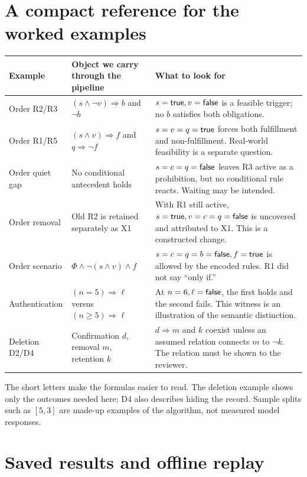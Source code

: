 \section{A compact reference for the worked examples}\label{app:examples}

\begin{longtable}{@{}p{.17\linewidth}p{.36\linewidth}p{.41\linewidth}@{}}
\toprule
Example & Object we carry through the pipeline & What to look for \\
\midrule
\endhead
Order R2/R3 & $(s\land\neg v)\Rightarrow b$ and $\neg b$ & $s=\mathsf{true},v=\mathsf{false}$ is a feasible trigger; no $b$ satisfies both obligations. \\
Order R1/R5 & $(s\land v)\Rightarrow f$ and $q\Rightarrow\neg f$ & $s=v=q=\mathsf{true}$ forces both fulfillment and non-fulfillment. Real-world feasibility is a separate question. \\
Order quiet gap & No conditional antecedent holds & $s=c=q=\mathsf{false}$ leaves R3 active as a prohibition, but no conditional rule reacts. Waiting may be intended. \\
Order removal & Old R2 is retained separately as X1 & With R1 still active, $s=\mathsf{true},v=c=q=\mathsf{false}$ is uncovered and attributed to X1. This is a constructed change. \\
Order scenario & $\Phi\land\neg(s\land v)\land f$ & $s=c=q=b=\mathsf{false},f=\mathsf{true}$ is allowed by the encoded rules. R1 did not say ``only if.'' \\
Authentication & $(n=5)\Rightarrow\ell$ versus $(n\ge5)\Rightarrow\ell$ & At $n=6,\ell=\mathsf{false}$, the first holds and the second fails. This witness is an illustration of the semantic distinction. \\
Deletion D2/D4 & Confirmation $d$, removal $m$, retention $k$ & $d\Rightarrow m$ and $k$ coexist unless an assumed relation connects $m$ to $\neg k$. The relation must be shown to the reviewer. \\
\bottomrule
\end{longtable}

The short letters make the formulas easier to read. The deletion example shows only the outcomes needed here; D4 also describes hiding the record. Sample splits such as $[5,3]$ are made-up examples of the algorithm, not measured model responses.

\section{Saved results and offline replay}\label{app:artifacts}

